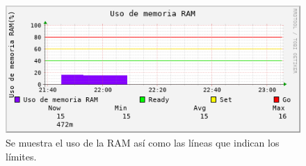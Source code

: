 \pagebreak
\begin{figure}[!htpb]
	\hypertarget{fig:uso_ram}{\hspace{1pt}}
	\begin{center}
		\includegraphics{imagenes/LineaBase/uso_ram.png}
		\caption{Se muestra el uso de la RAM así como las líneas que indican los límites.}
		\label{fig:uso_ram}	
	\end{center}
\end{figure}